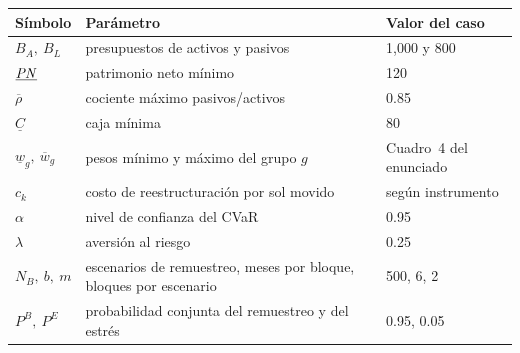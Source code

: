 \begin{center}
\small
\begin{tabular}{lp{}l}
\toprule
Símbolo & Parámetro & Valor del caso \\
\midrule
$B_A,\ B_L$ & presupuestos de activos y pasivos & 1,000 y 800 \\
$\underline{\mathit{PN}}$ & patrimonio neto mínimo & 120 \\
$\overline{\rho}$ & cociente máximo pasivos/activos & 0.85 \\
$\underline{C}$ & caja mínima & 80 \\
$\underline{w}_g,\ \overline{w}_g$ & pesos mínimo y máximo del grupo $g$ & Cuadro~4 del enunciado \\
$c_k$ & costo de reestructuración por sol movido & según instrumento \\
$\alpha$ & nivel de confianza del CVaR & 0.95 \\
$\lambda$ & aversión al riesgo & 0.25 \\
$N_B,\ b,\ m$ & escenarios de remuestreo, meses por bloque, bloques por escenario & 500, 6, 2 \\
$P^B,\ P^E$ & probabilidad conjunta del remuestreo y del estrés & 0.95, 0.05 \\
\bottomrule
\end{tabular}
\end{center}

